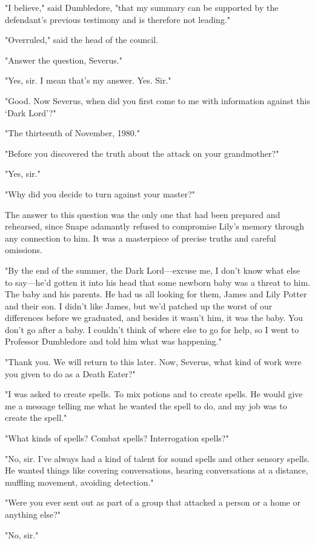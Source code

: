 "I believe," said Dumbledore, "that my summary can be supported by the defendant's previous testimony and is therefore not leading."

"Overruled," said the head of the council.

"Answer the question, Severus."

"Yes, sir. I mean that's my answer. Yes. Sir."

"Good. Now Severus, when did you first come to me with information against this `Dark Lord'?"

"The thirteenth of November, 1980."

"Before you discovered the truth about the attack on your grandmother?"

"Yes, sir."

"Why did you decide to turn against your master?"

The answer to this question was the only one that had been prepared and rehearsed, since Snape adamantly refused to compromise Lily's memory through any connection to him. It was a masterpiece of precise truths and careful omissions.

"By the end of the summer, the Dark Lord—excuse me, I don't know what else to say—he'd gotten it into his head that some newborn baby was a threat to him. The baby and his parents. He had us all looking for them, James and Lily Potter and their son. I didn't like James, but we'd patched up the worst of our differences before we graduated, and besides it wasn't him, it was the baby. You don't go after a baby. I couldn't think of where else to go for help, so I went to Professor Dumbledore and told him what was happening."

"Thank you. We will return to this later. Now, Severus, what kind of work were you given to do as a Death Eater?"

"I was asked to create spells. To mix potions and to create spells. He would give me a message telling me what he wanted the spell to do, and my job was to create the spell."

"What kinds of spells? Combat spells? Interrogation spells?"

"No, sir. I've always had a{\el} kind of talent for sound spells and other sensory spells. He wanted things like covering conversations, hearing conversations at a distance, muffling movement, avoiding detection."

"Were you ever sent out as part of a group that attacked a person or a home or anything else?"

"No, sir."

